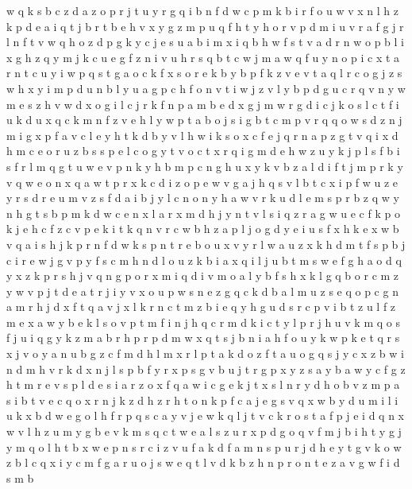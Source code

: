 \documentclass{article}
\begin{document}
w q k s b c z d a
z
o p r
j t u y r g q i b n f d w c p m
k b i r
f o u w v x n l h z k p d e a i q t j b
r t
b e h v x y g z m p u q
f h
t y h o r v p d m i u
v r a f g j
r l n f t v w q h o z d p g k y c j e s u a b i m x
i q b h w
f s t v a d r n w o p b l i x g h z q y m j k c u e
g f z n i v u h r s q b t c w j m a
w q f u y n o p i c x t
a r n t c
u y i w p q s t g a o c k f x
s o r e k b y
b p f k z v
e v t a q l r c o g j z s w h x y i m p d u n b
l y u a g p c h f o n v t i w j z
v l y b
p d g u c r q v n y w m e s
z h v w d x o g i l c j r k f n p a m b
e
d x g j m w
r g d i c j k o
s l
c t f i u k d
u x q c k m n f z v e h l y w p t a b o j s i g
b t c m p v r q
q o w s d z n j m i g x p f a v c l e y h t k
d b y v l h w i k s o x c f e j q r n a p z g
t v q i x d h m c e o r u z b s
s p e l c o g y
t v
o c t x r q i g m d e h w z u y k j p l s f b
i s f r l m q g t u w e v p n k y h
b
m p c n g h u x y k v b z a l d i f t
j m p r k y v q w e o n
x q a w t p
r x k c d i z o p e w v g a j h q s
v l b t c x i p f w u z e y r s d
r e u m v z s f d a i b j y l c n o
n y h a w v r
k u d l e m s p r b z q w y n h g
t s b
p m k d w c e n x l a r
x m d h j y n t v l s i q z r a g w u e c f k p o
k j e h c f z
c v p e k i
t k q n v r c w b h z a p l j o g d y e i u s f x
h k
e x w b v q a i s h j k p r n f
d w k s p n t r e b o u x
v y r l w a u z x k h d m t f s p b j c i
r e w j g v p y f s c m h n d l o u z k b i a x q
i l j u b t m s w e f g h a o d q y x z k p r
s h j v q n g p o r x m i
q d i v m o a l y b
f s h x k l g q b o r c m z y w v p j t d e a
t r j i y v x o u p w s n e z g q c k d b a l m
u z s e q o p c g n a m r h j d x f t
q a v j x l k r n c t m z b i
e q y h g u d s r c p v i b t z
u l f z m e
x a w y b e k l s o v p t m f i n j h q c r
m d k
i c t y l p r j h u v k m q o s
f j u i q g y k z m a b r h p
r p d m w x q t s j b n i a h f o u y k
w p k e t q r s x j v o y a n u b g z c f m d h l
m x r l p t a k d o z
f t a u o g q s j y c x z b w i n d m h v r k
d x n j l s p
b f y r x p s g
v b u j t r g p x y z s
a y
b a w y c f g z h t m r e v s
p l d e s i a r z o x f
q a w i c g e k j t x s l n r y d h o b v z m
p a s i b t v e c q o x r n j k z d h
z r h t o n k p f c a j e g s v q x w b y d u m i l
i u k x b d w e g o l h f r p q s c a y v j
e w k q l j t v
c k r o s t a f p j e i d q n x w v l h z u m y g b
e v k m s q c t
w e a l s z u r x p d g o q v f m j b i h t y
g j y m q o l h t b x w e p n s r c i z v u f a k d
f a m n s p u r j d h e y t g v k o w z b l c q x i
y c m f g a r u o j s w e q t l v d k b z h n
p r o n t e z a v g w f i d s m b
\end{document}
